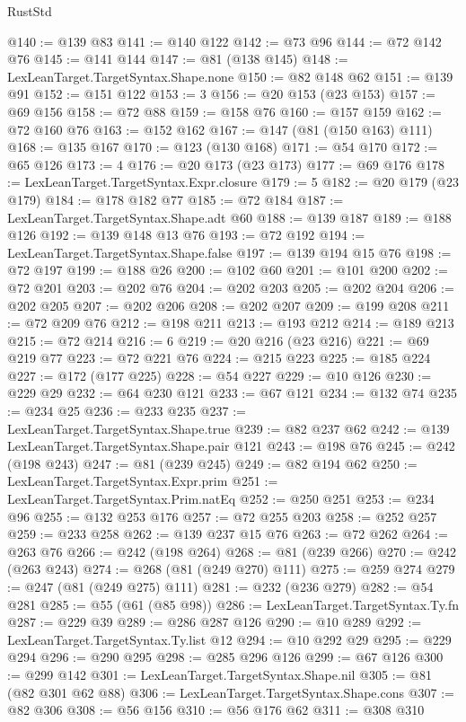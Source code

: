 \begin{lexlean}{RustStd}
\begin{coremodule}
@140 := @139 @83
@141 := @140 @122
@142 := @73 @96
@144 := @72 @142 @76
@145 := @141 @144
@147 := @81 (@138 @145)
@148 := LexLeanTarget.TargetSyntax.Shape.none
@150 := @82 @148 @62
@151 := @139 @91
@152 := @151 @122
@153 := 3
@156 := @20 @153 (@23 @153)
@157 := @69 @156
@158 := @72 @88
@159 := @158 @76
@160 := @157 @159
@162 := @72 @160 @76
@163 := @152 @162
@167 := @147 (@81 (@150 @163) @111)
@168 := @135 @167
@170 := @123 (@130 @168)
@171 := @54 @170
@172 := @65 @126
@173 := 4
@176 := @20 @173 (@23 @173)
@177 := @69 @176
@178 := LexLeanTarget.TargetSyntax.Expr.closure
@179 := 5
@182 := @20 @179 (@23 @179)
@184 := @178 @182 @77
@185 := @72 @184
@187 := LexLeanTarget.TargetSyntax.Shape.adt @60
@188 := @139 @187
@189 := @188 @126
@192 := @139 @148 @13 @76
@193 := @72 @192
@194 := LexLeanTarget.TargetSyntax.Shape.false
@197 := @139 @194 @15 @76
@198 := @72 @197
@199 := @188 @26
@200 := @102 @60
@201 := @101 @200
@202 := @72 @201
@203 := @202 @76
@204 := @202 @203
@205 := @202 @204
@206 := @202 @205
@207 := @202 @206
@208 := @202 @207
@209 := @199 @208
@211 := @72 @209 @76
@212 := @198 @211
@213 := @193 @212
@214 := @189 @213
@215 := @72 @214
@216 := 6
@219 := @20 @216 (@23 @216)
@221 := @69 @219 @77
@223 := @72 @221 @76
@224 := @215 @223
@225 := @185 @224
@227 := @172 (@177 @225)
@228 := @54 @227
@229 := @10 @126
@230 := @229 @29
@232 := @64 @230 @121
@233 := @67 @121
@234 := @132 @74
@235 := @234 @25
@236 := @233 @235
@237 := LexLeanTarget.TargetSyntax.Shape.true
@239 := @82 @237 @62
@242 := @139 LexLeanTarget.TargetSyntax.Shape.pair @121
@243 := @198 @76
@245 := @242 (@198 @243)
@247 := @81 (@239 @245)
@249 := @82 @194 @62
@250 := LexLeanTarget.TargetSyntax.Expr.prim
@251 := LexLeanTarget.TargetSyntax.Prim.natEq
@252 := @250 @251
@253 := @234 @96
@255 := @132 @253 @176
@257 := @72 @255 @203
@258 := @252 @257
@259 := @233 @258
@262 := @139 @237 @15 @76
@263 := @72 @262
@264 := @263 @76
@266 := @242 (@198 @264)
@268 := @81 (@239 @266)
@270 := @242 (@263 @243)
@274 := @268 (@81 (@249 @270) @111)
@275 := @259 @274
@279 := @247 (@81 (@249 @275) @111)
@281 := @232 (@236 @279)
@282 := @54 @281
@285 := @55 (@61 (@85 @98))
@286 := LexLeanTarget.TargetSyntax.Ty.fn
@287 := @229 @39
@289 := @286 @287 @126
@290 := @10 @289
@292 := LexLeanTarget.TargetSyntax.Ty.list @12
@294 := @10 @292 @29
@295 := @229 @294
@296 := @290 @295
@298 := @285 @296 @126
@299 := @67 @126
@300 := @299 @142
@301 := LexLeanTarget.TargetSyntax.Shape.nil
@305 := @81 (@82 @301 @62 @88)
@306 := LexLeanTarget.TargetSyntax.Shape.cons
@307 := @82 @306
@308 := @56 @156
@310 := @56 @176 @62
@311 := @308 @310

\end{coremodule}
\end{lexlean}
